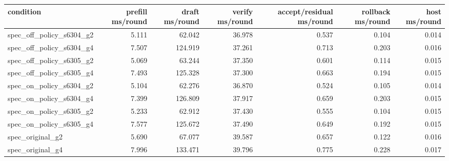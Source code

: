 \begin{tabular}{lrrrrrr}
\toprule
condition & prefill ms/round & draft ms/round & verify ms/round & accept/residual ms/round & rollback ms/round & host ms/round \\
\midrule
spec\_off\_policy\_s6304\_g2 & 5.111 & 62.042 & 36.978 & 0.537 & 0.104 & 0.014 \\
spec\_off\_policy\_s6304\_g4 & 7.507 & 124.919 & 37.261 & 0.713 & 0.203 & 0.016 \\
spec\_off\_policy\_s6305\_g2 & 5.069 & 63.244 & 37.350 & 0.601 & 0.114 & 0.015 \\
spec\_off\_policy\_s6305\_g4 & 7.493 & 125.328 & 37.300 & 0.663 & 0.194 & 0.015 \\
spec\_on\_policy\_s6304\_g2 & 5.104 & 62.276 & 36.870 & 0.524 & 0.105 & 0.014 \\
spec\_on\_policy\_s6304\_g4 & 7.399 & 126.809 & 37.917 & 0.659 & 0.203 & 0.015 \\
spec\_on\_policy\_s6305\_g2 & 5.233 & 62.912 & 37.430 & 0.555 & 0.104 & 0.015 \\
spec\_on\_policy\_s6305\_g4 & 7.577 & 125.672 & 37.490 & 0.649 & 0.192 & 0.015 \\
spec\_original\_g2 & 5.690 & 67.077 & 39.587 & 0.657 & 0.122 & 0.016 \\
spec\_original\_g4 & 7.996 & 133.471 & 39.796 & 0.775 & 0.228 & 0.017 \\
\bottomrule
\end{tabular}
